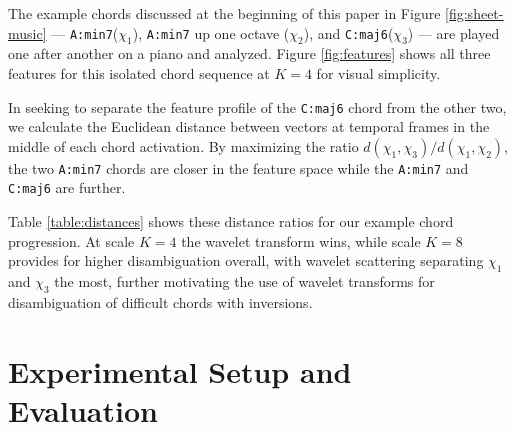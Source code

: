 \documentclass{article}
\makeatletter
\newcommand{\Amin}{\texttt{A:min7}\@\xspace}
\newcommand{\Csix}{\texttt{C:maj6}\@\xspace}
\makeatother
\begin{document}
The example chords discussed at the beginning of this paper in Figure \ref{fig:sheet-music} ---
\Amin ($\chi_1$), \Amin up one octave ($\chi_2$), and \Csix ($\chi_3$) ---  are played one after another on a piano and analyzed. Figure \ref{fig:features} shows all three features for this isolated chord sequence at $K=4$ for visual simplicity. 

In seeking to separate the feature profile of the \Csix chord from the other two, we calculate the Euclidean distance between vectors at temporal frames in the middle of each chord activation. By maximizing the ratio $d(\chi_1,\chi_3)/d(\chi_1,\chi_2)$, the two \Amin chords are closer in the feature space while the \Amin and \Csix are further.

Table \ref{table:distances} shows these distance ratios for our example chord progression. At scale $K=4$ the wavelet transform wins, while scale $K=8$ provides for higher disambiguation overall, with wavelet scattering separating $\chi_1$ and $\chi_3$ the most, further motivating the use of wavelet transforms for disambiguation of difficult chords with inversions.

\section{Experimental Setup and Evaluation}\label{sec:experiment}
\end{document}
